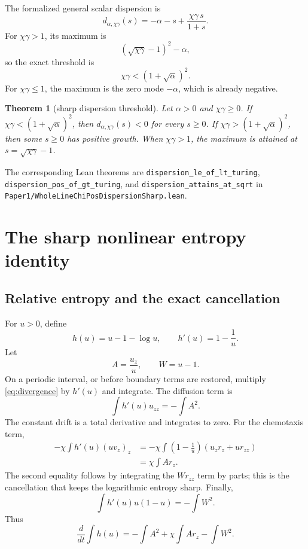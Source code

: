 \documentclass[11pt]{article}
\newcommand{\code}[1]{\nolinkurl{#1}}
\newtheorem{theorem}{Theorem}
\begin{document}
The formalized general scalar dispersion is
\[
  d_{\alpha,\chi\gamma}(s)
    =-\alpha-s+\frac{\chi\gamma\,s}{1+s}.
\]
For \(\chi\gamma>1\), its maximum is
\[
  (\sqrt{\chi\gamma}-1)^2-\alpha,
\]
so the exact threshold is
\begin{equation}
  \chi\gamma<(1+\sqrt\alpha)^2.                         \label{eq:general-threshold}
\end{equation}
For \(\chi\gamma\le1\), the maximum is the zero mode
\(-\alpha\), which is already negative.

\begin{theorem}[sharp dispersion threshold]
Let \(\alpha>0\) and \(\chi\gamma\ge0\).
If \(\chi\gamma<(1+\sqrt\alpha)^2\), then
\(d_{\alpha,\chi\gamma}(s)<0\) for every \(s\ge0\).
If \(\chi\gamma>(1+\sqrt\alpha)^2\), then some \(s\ge0\)
has positive growth.  When \(\chi\gamma>1\), the maximum is attained at
\(s=\sqrt{\chi\gamma}-1\).
\end{theorem}

\noindent The corresponding Lean theorems are
\code{dispersion_le_of_lt_turing},
\code{dispersion_pos_of_gt_turing}, and
\code{dispersion_attains_at_sqrt} in
\code{Paper1/WholeLineChiPosDispersionSharp.lean}.

\section{The sharp nonlinear entropy identity}

\subsection{Relative entropy and the exact cancellation}

For \(u>0\), define
\[
  h(u)=u-1-\log u,\qquad h'(u)=1-\frac1u.
\]
Let
\[
  A=\frac{u_z}{u},\qquad W=u-1.
\]
On a periodic interval, or before boundary terms are restored, multiply
\eqref{eq:divergence} by \(h'(u)\) and integrate.  The diffusion term is
\[
  \int h'(u)u_{zz}=-\int A^2.
\]
The constant drift is a total derivative and integrates to zero.  For the
chemotaxis term,
\begin{align*}
 -\chi\int h'(u)(uv_z)_z
 &= -\chi\int
     \left(1-\frac1u\right)(u_zr_z+ur_{zz})\\
 &= \chi\int A r_z.
\end{align*}
The second equality follows by integrating the \(Wr_{zz}\) term by parts;
this is the cancellation that keeps the logarithmic entropy sharp.  Finally,
\[
  \int h'(u)u(1-u)=-\int W^2.
\]
Thus
\begin{equation}
  \frac{d}{dt}\int h(u)
   =-\int A^2+\chi\int A r_z-\int W^2.                  \label{eq:entropy-raw}
\end{equation}
\end{document}
